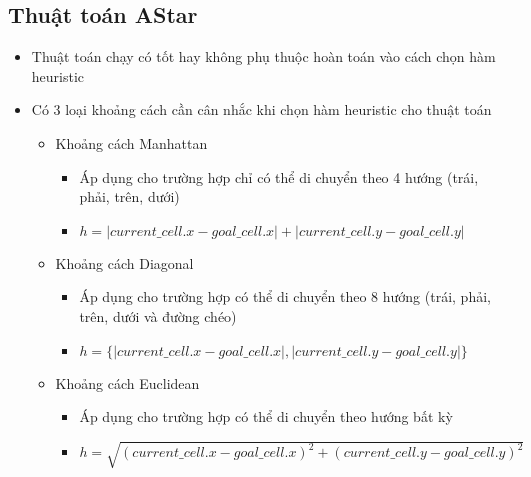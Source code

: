 \documentclass[a4paper, 12pt]{article}
\begin{document}
    \subsection{Thuật toán AStar}
    \begin{itemize}
        \item Thuật toán chạy có tốt hay không phụ thuộc hoàn toán vào cách chọn hàm heuristic
        \item Có 3 loại khoảng cách cần cân nhắc khi chọn hàm heuristic cho thuật toán
        \begin{itemize}
            \item Khoảng cách Manhattan
            \begin{itemize}
                \begin{figure}[H]
                    \texttt{[image: images/manhattan.png]}
                    \caption{Khoảng cách Manhattan}
                \end{figure}
                \item Áp dụng cho trường hợp chỉ có thể di chuyển theo 4 hướng (trái, phải, trên, dưới)
                \item $h = |current\_cell.x - goal\_cell.x|+ |current\_cell.y - goal\_cell.y|$
            \end{itemize}

            \item Khoảng cách Diagonal
            \begin{itemize}
                \begin{figure}[H]
                    \texttt{[image: images/diagonal.png]}
                    \caption{Khoảng cách Diaginal}
                \end{figure}
                \item Áp dụng cho trường hợp có thể di chuyển theo 8 hướng (trái, phải, trên, dưới và đường chéo)
                \item $h = \{|current\_cell.x - goal\_cell.x|, |current\_cell.y - goal\_cell.y|\}$
            \end{itemize}

            \item Khoảng cách Euclidean
            \begin{itemize}
                \begin{figure}[H]
                    \texttt{[image: images/euclidean.png]}
                    \caption{Khoảng cách Euclidean}
                \end{figure}
                \item Áp dụng cho trường hợp có thể di chuyển theo hướng bất kỳ
                \item $h = \sqrt{(current\_cell.x - goal\_cell.x)^2 + (current\_cell.y - goal\_cell.y)^2}$
            \end{itemize}
        \end{itemize}


\end{itemize}
\end{document}
